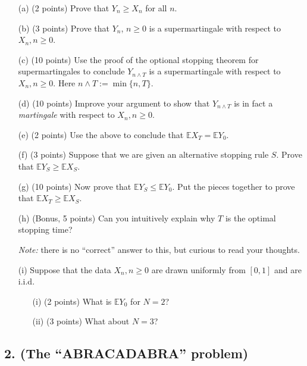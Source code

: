 \documentclass{article}
\begin{document}
\begin{enumerate}
    \item[(a)] (2 points) Prove that $Y_n \geq X_n$ for all $n$.
    
    \item[(b)] (3 points) Prove that $Y_n$, $n \geq 0$ is a supermartingale with respect to $X_n, n \geq 0$.
    
    \item[(c)] (10 points) Use the proof of the optional stopping theorem for supermartingales to conclude $Y_{n \wedge T}$ is a supermartingale with respect to $X_n, n \geq 0$. Here $n \wedge T := \min\{n, T\}$.
    
    \item[(d)] (10 points) Improve your argument to show that $Y_{n \wedge T}$ is in fact a \textit{martingale} with respect to $X_n, n \geq 0$.
    
    \item[(e)] (2 points) Use the above to conclude that $\mathbb{E}X_T = \mathbb{E}Y_0$.
    
    \item[(f)] (3 points) Suppose that we are given an alternative stopping rule $S$. Prove that $\mathbb{E}Y_S \geq \mathbb{E}X_S$.
    
    \item[(g)] (10 points) Now prove that $\mathbb{E}Y_S \leq \mathbb{E}Y_0$. Put the pieces together to prove that $\mathbb{E}X_T \geq \mathbb{E}X_S$.
    
    \item[(h)] (Bonus, 5 points) Can you intuitively explain why $T$ is the optimal stopping time?

    \textit{Note:} there is no ``correct'' answer to this, but curious to read your thoughts.

    \item[(i)] Suppose that the data $X_n, n \geq 0$ are drawn uniformly from $[0, 1]$ and are i.i.d.
    \begin{enumerate}
        \item[(i)] (2 points) What is $\mathbb{E}Y_0$ for $N = 2$?
        \item[(ii)] (3 points) What about $N = 3$?
    \end{enumerate}
\end{enumerate}

\subsection*{2. (The “ABRACADABRA” problem)}
\end{document}
